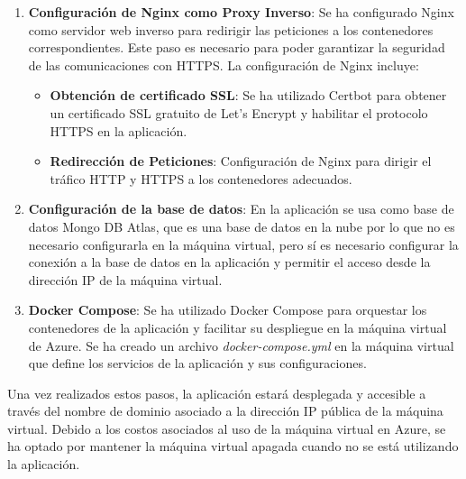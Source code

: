 \begin{enumerate}
    \item \textbf{Configuración de Nginx como Proxy Inverso}: Se ha configurado Nginx como servidor web inverso para redirigir las peticiones a los contenedores correspondientes.
    Este paso es necesario para poder garantizar la seguridad de las comunicaciones con HTTPS. La configuración de Nginx incluye:
    \begin{itemize}
        \item \textbf{Obtención de certificado SSL}: Se ha utilizado Certbot para obtener un certificado SSL gratuito de Let's Encrypt y habilitar el protocolo HTTPS en la aplicación.
        \item \textbf{Redirección de Peticiones}: Configuración de Nginx para dirigir el tráfico HTTP y HTTPS a los contenedores adecuados.
    \end{itemize}

    \item \textbf{Configuración de la base de datos}: En la aplicación se usa como base de datos Mongo DB Atlas, que es una base de datos en la nube por lo que no es necesario configurarla en la máquina virtual, 
    pero sí es necesario configurar la conexión a la base de datos en la aplicación y permitir el acceso desde la dirección IP de la máquina virtual.

    \item \textbf{Docker Compose}: Se ha utilizado Docker Compose para orquestar los contenedores de la aplicación y facilitar su despliegue en la máquina virtual de Azure.
    Se ha creado un archivo \textit{docker-compose.yml} en la máquina virtual que define los servicios de la aplicación y sus configuraciones.

\end{enumerate}

Una vez realizados estos pasos, la aplicación estará desplegada y accesible a través del nombre de dominio asociado a la dirección IP pública de la máquina virtual.
Debido a los costos asociados al uso de la máquina virtual en Azure, se ha optado por mantener la máquina virtual apagada cuando no se está utilizando la aplicación.



